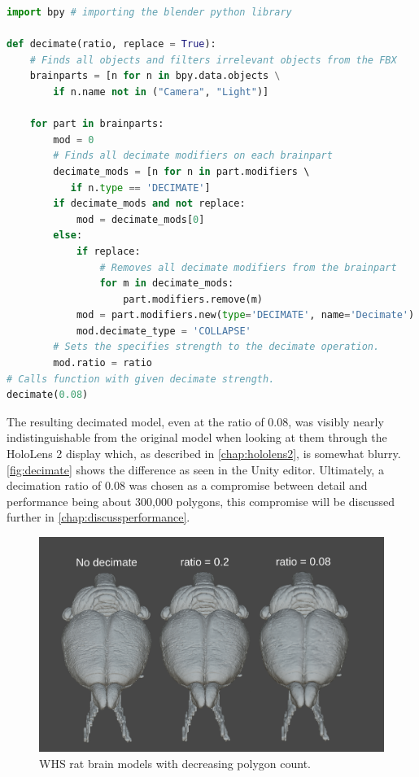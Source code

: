\begin{lstlisting}[language=python, label={item:blenderscript}, caption={Blender script applying a decimate modifier to all relevant objects in a scene.}]
import bpy # importing the blender python library

def decimate(ratio, replace = True):
    # Finds all objects and filters irrelevant objects from the FBX 
    brainparts = [n for n in bpy.data.objects \
        if n.name not in ("Camera", "Light")] 

    for part in brainparts:
        mod = 0
        # Finds all decimate modifiers on each brainpart
        decimate_mods = [n for n in part.modifiers \ 
           if n.type == 'DECIMATE']
        if decimate_mods and not replace:
            mod = decimate_mods[0]
        else:
            if replace: 
                # Removes all decimate modifiers from the brainpart
                for m in decimate_mods:
                    part.modifiers.remove(m)
            mod = part.modifiers.new(type='DECIMATE', name='Decimate')
            mod.decimate_type = 'COLLAPSE'
        # Sets the specifies strength to the decimate operation. 
        mod.ratio = ratio
# Calls function with given decimate strength.
decimate(0.08)
\end{lstlisting}

The resulting decimated model, even at the ratio of 0.08, was visibly nearly indistinguishable from the original model when looking at them through the HoloLens 2 display which, as described in \autoref{chap:hololens2}, is somewhat blurry. \autoref{fig:decimate} shows the difference as seen in the Unity editor. Ultimately, a decimation ratio of 0.08 was chosen as a compromise between detail and performance being about 300,000 polygons, this compromise will be discussed further in \autoref{chap:discussperformance}.
\begin{figure}[ht]
    \includegraphics[width=\textwidth]{fig/brainmodeldecimateratio2.png}
    \caption{WHS rat brain models with decreasing polygon count.}
    \label{fig:decimate}
\end{figure}



